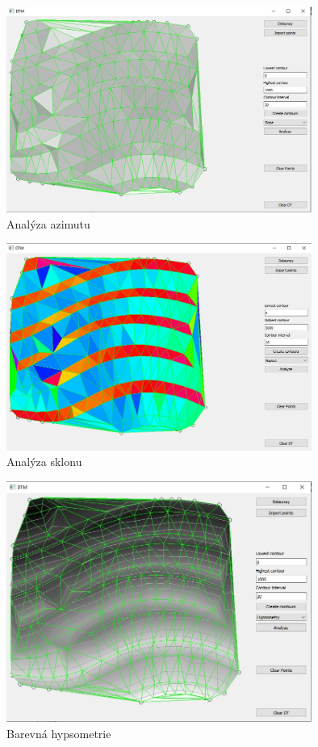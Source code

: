 \documentclass[a4paper, 12pt]{article}
\begin{document}
 \begin{figure}[h!]
	\centering
	\includegraphics[width=10cm]{test32.jpg}
	\caption{Analýza azimutu}
\end{figure}

 \begin{figure}[h!]
	\centering
	\includegraphics[width=10cm]{test33.jpg}
	\caption{Analýza sklonu}
\end{figure}

 \begin{figure}[h!]
	\centering
	\includegraphics[width=10cm]{test35.jpg}
	\caption{Barevná hypsometrie}
\end{figure}
\end{document}
